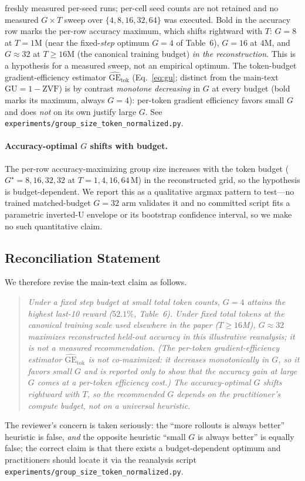 \documentclass{article}
\begin{document}
\begin{table}[ht]
{freshly measured per-seed runs; per-cell seed counts are not retained and no
measured $G\times T$ sweep over $\{4,8,16,32,64\}$ was executed. Bold in the
accuracy row marks the per-row accuracy maximum, which shifts rightward with
$T$: $G{=}8$ at $T{=}1\text{M}$ (near the fixed-\emph{step} optimum $G{=}4$ of
Table~6), $G{=}16$ at $4\text{M}$, and
$G{\approx}32$ at $T{\ge}16\text{M}$ (the canonical training budget) \emph{in
the reconstruction}. This is a hypothesis for a measured sweep, not an
empirical optimum. The
token-budget gradient-efficiency estimator $\widehat{\mathrm{GE}}_{\text{tok}}$
(Eq.~\ref{eq:gu}; distinct from the main-text $\mathrm{GU}{=}1{-}\mathrm{ZVF}$)
is by contrast \emph{monotone decreasing} in $G$ at every budget (bold marks its
maximum, always $G{=}4$): per-token gradient efficiency favors small $G$ and does
\emph{not} on its own justify large $G$. See
\texttt{experiments/group\_size\_token\_normalized.py}.}
\label{tab:groupsize-tokennorm}
\end{table}

\paragraph{Accuracy-optimal $G$ shifts with budget.}
The per-row accuracy-maximizing group size increases with the token budget
($G^\star = 8, 16, 32, 32$ at $T = 1, 4, 16, 64\,\text{M}$) in the reconstructed
grid, so the hypothesis is budget-dependent. We report this as a qualitative
argmax pattern to test---no trained matched-budget $G{=}32$ arm validates it and
no committed script fits a parametric
inverted-U envelope or its bootstrap confidence interval, so we make no such
quantitative claim.

\subsection{Reconciliation Statement}

We therefore revise the main-text claim as follows.
\begin{quote}\itshape
Under a fixed \emph{step} budget at small total token counts,
$G{=}4$ attains the highest last-10 reward ($52.1\%$, Table~6).
Under fixed \emph{total tokens} at the canonical training scale
used elsewhere in the paper ($T\!\ge\!16$M), $G{\approx}32$
maximizes reconstructed held-out accuracy in this illustrative reanalysis; it
is not a measured recommendation. (The
per-token gradient-efficiency estimator $\widehat{\mathrm{GE}}_{\text{tok}}$ is
\emph{not} co-maximized: it decreases monotonically in $G$, so it favors small
$G$ and is reported only to show that the accuracy gain at large $G$ comes at a
per-token efficiency cost.) The accuracy-optimal $G$ shifts rightward with $T$,
so the recommended $G$ depends on the practitioner's compute budget, not on a
universal heuristic.
\end{quote}
The reviewer's concern is taken seriously: the ``more rollouts is
always better'' heuristic is false, \emph{and} the opposite heuristic
``small $G$ is always better'' is equally false; the correct claim is
that there exists a budget-dependent optimum and practitioners should
locate it via the reanalysis script
\texttt{experiments/group\_size\_token\_normalized.py}.
\end{document}
